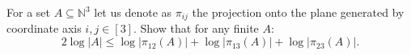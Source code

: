 For a set $A \subseteq \mathbb{N}^3$ let us denote as $\pi_{ij}$ the projection onto the plane
generated by coordinate axis $i, j \in [3]$. Show that for any finite $A$:
$$
    2 \log |A| \le \log |\pi_{12}(A)| + \log |\pi_{13}(A)| + \log |\pi_{23}(A)|.
$$